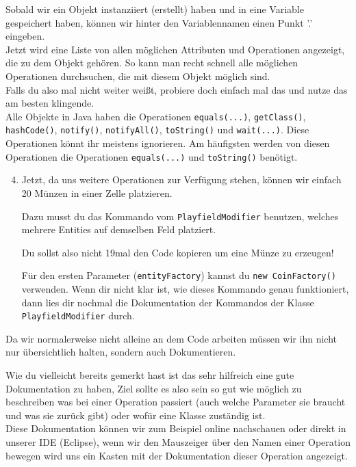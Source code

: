 \begin{Infobox}[Autocompletion]
    Sobald wir ein Objekt instanziiert (erstellt) haben und in eine Variable gespeichert haben, können wir hinter den Variablennamen einen Punkt '.' eingeben.\\
    Jetzt wird eine Liste von allen möglichen Attributen und Operationen angezeigt, die zu dem Objekt gehören. 
    So kann man recht schnell alle möglichen Operationen durchsuchen, die mit diesem Objekt möglich sind.\\
    Falls du also mal nicht weiter weißt, probiere doch einfach mal das und nutze das am besten klingende.\\

    Alle Objekte in Java haben die Operationen \lstinline{equals(...)}, \lstinline{getClass()}, \lstinline{hashCode()}, \lstinline{notify()}, \lstinline{notifyAll()}, \lstinline{toString()} und \lstinline{wait(...)}.
    Diese Operationen könnt ihr meistens ignorieren.
    Am häufigsten werden von diesen Operationen die Operationen \lstinline{equals(...)} und \lstinline{toString()} benötigt.
\end{Infobox}

\begin{enumerate} \setcounter{enumi}{3}
    \item Jetzt, da uns weitere Operationen zur Verfügung stehen, können wir einfach 20 Münzen in einer Zelle platzieren.

        Dazu musst du das Kommando vom \lstinline{PlayfieldModifier} benutzen, welches mehrere Entities auf demselben Feld platziert.

        Du sollst also nicht 19mal den Code kopieren um eine Münze zu erzeugen!

        Für den ersten Parameter (\lstinline{entityFactory}) kannst du \lstinline{new CoinFactory()} verwenden.
        Wenn dir nicht klar ist, wie dieses Kommando genau funktioniert, dann lies dir nochmal die Dokumentation der Kommandos der Klasse \lstinline{PlayfieldModifier} durch.
\end{enumerate}

\begin{Infobox}
    Da wir normalerweise nicht alleine an dem Code arbeiten müssen wir ihn nicht nur übersichtlich halten, sondern auch Dokumentieren.

    Wie du vielleicht bereits gemerkt hast ist das sehr hilfreich eine gute Dokumentation zu haben, Ziel sollte es also sein so gut wie möglich zu beschreiben was bei einer Operation passiert (auch welche Parameter sie braucht und was sie zurück gibt) oder wofür eine Klasse zuständig ist.\\

    Diese Dokumentation können wir zum Beispiel online nachschauen oder direkt in unserer IDE (Eclipse), wenn wir den Mauszeiger über den Namen einer Operation bewegen wird uns ein Kasten mit der Dokumentation dieser Operation angezeigt.
\end{Infobox}


